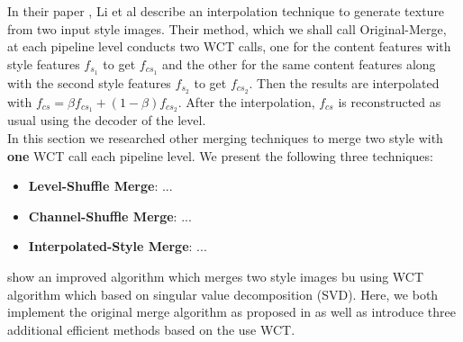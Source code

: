 In their paper \cite{bib11}, Li et al describe an interpolation technique to generate texture from two input style images. Their method, which we shall call Original-Merge, at each pipeline level conducts two WCT calls, one for the content features with style features $f_{s_1}$ to get $f_{cs_1}$ and the other for the same content features along with the second style features $f_{s_2}$ to get $f_{cs_2}$. Then the results are interpolated with $f_{cs} = \beta f_{cs_1} + (1-\beta)f_{cs_2}$. After the interpolation, $f_{cs}$ is reconstructed as usual using the decoder of the level.\\

In this section we researched other merging techniques to merge two style with \textbf{one} WCT call each pipeline level. We present the following three techniques:
\begin{itemize}
	\item \textbf{Level-Shuffle Merge}: ...
	\item \textbf{Channel-Shuffle Merge}: ...
	\item \textbf{Interpolated-Style Merge}: ...
	
\end{itemize}
show an improved algorithm which merges two style images bu using WCT algorithm which based on singular value decomposition (SVD). Here, we both implement the original merge algorithm as proposed in \cite{bib11} as well as introduce three additional efficient methods based on the use WCT.